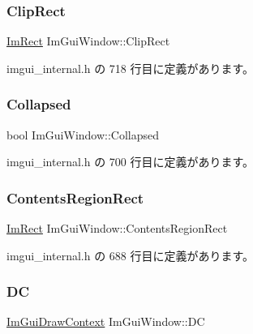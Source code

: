 \subsubsection{\texorpdfstring{Clip\+Rect}{ClipRect}}
{\footnotesize\ttfamily \mbox{\hyperlink{struct_im_rect}{Im\+Rect}} Im\+Gui\+Window\+::\+Clip\+Rect}



 imgui\+\_\+internal.\+h の 718 行目に定義があります。

\mbox{\label{struct_im_gui_window_a04e6b533b2401d1c7e78b47e31538e7b}} 
\subsubsection{\texorpdfstring{Collapsed}{Collapsed}}
{\footnotesize\ttfamily bool Im\+Gui\+Window\+::\+Collapsed}



 imgui\+\_\+internal.\+h の 700 行目に定義があります。

\mbox{\label{struct_im_gui_window_ac0d04b743eab132900c1ededc8eab9f6}} 
\subsubsection{\texorpdfstring{Contents\+Region\+Rect}{ContentsRegionRect}}
{\footnotesize\ttfamily \mbox{\hyperlink{struct_im_rect}{Im\+Rect}} Im\+Gui\+Window\+::\+Contents\+Region\+Rect}



 imgui\+\_\+internal.\+h の 688 行目に定義があります。

\mbox{\label{struct_im_gui_window_a3a20c68996093058481ae8e174258a04}} 
\subsubsection{\texorpdfstring{DC}{DC}}
{\footnotesize\ttfamily \mbox{\hyperlink{struct_im_gui_draw_context}{Im\+Gui\+Draw\+Context}} Im\+Gui\+Window\+::\+DC}



